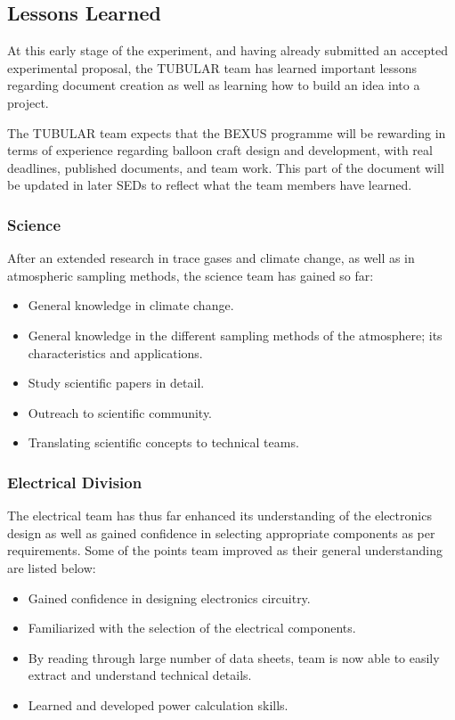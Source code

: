 \documentclass[a4paper,12pt,twoside]{article}
\begin{document}
 
\pagebreak
\subsection{Lessons Learned}
At this early stage of the experiment, and having already submitted an accepted experimental proposal, the TUBULAR team has learned important lessons regarding document creation as well as learning how to build an idea into a project. \par
The TUBULAR team expects that the BEXUS programme will be rewarding in terms of experience regarding balloon craft design and development, with real deadlines, published documents, and team work. This part of the document will be updated in later SEDs to reflect what the team members have learned.

\subsubsection{Science}
After an extended research in trace gases and climate change, as well as in atmospheric sampling methods, the science team has gained so far: 
\begin{itemize}
    \item General knowledge in climate change.
    \item General knowledge in the different sampling methods of the atmosphere; its characteristics and applications.
    \item Study scientific papers in detail.
    \item Outreach to scientific community.
    \item Translating scientific concepts to technical teams.
\end{itemize}


\subsubsection{Electrical Division}
The electrical team has thus far enhanced its understanding of the electronics design as well as gained confidence in selecting appropriate components as per requirements. Some of the points team improved as their general understanding are listed below:  
\begin{itemize}

    \item Gained confidence in designing electronics circuitry.
    \item Familiarized with the selection of the electrical components. 
    \item By reading through large number of data sheets, team is now able to easily extract and understand technical details. 
    \item Learned and developed power calculation skills.
\end{itemize}
\end{document}
